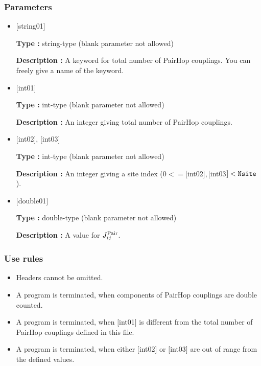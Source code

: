 \subsubsection{Parameters}
 \begin{itemize}

   \item  $[$string01$]$
   
    {\bf Type :} string-type (blank parameter not allowed)

   {\bf Description :} A keyword for total number of PairHop couplings. You can freely give a name of the keyword.

   \item  $[$int01$]$
   
    {\bf Type :} int-type (blank parameter not allowed)

   {\bf Description :}  An integer giving total number of PairHop couplings.

  \item  $[$int02$]$, $[$int03$]$
  
 {\bf Type :} int-type (blank parameter not allowed)

{\bf Description :} An integer giving a site index ($0<= [$int02$], [$int03$]<\verb|Nsite|$).
 
 \item  $[$double01$]$
   
   {\bf Type :} double-type (blank parameter not allowed)

  {\bf Description :}   A value for $J_{ij}^{\rm Pair}$.
  
\end{itemize}

\subsubsection{Use rules}
\begin{itemize}
\item Headers cannot be omitted. 
\item A program is terminated, when components of PairHop couplings are double counted.
\item A program is terminated, when $[$int01$]$ is different from the total number of PairHop couplings defined in this file.
\item A program is terminated, when either $[$int02$]$ or $[$int03$]$ are out of range from the defined values.
\end{itemize}

\newpage
